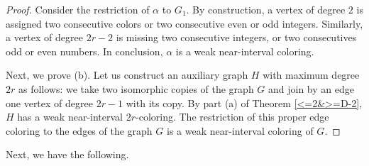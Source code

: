 \documentclass[12pt]{article}
\theoremstyle{plain}
\theoremstyle{definition}
\numberwithin{equation}{section}
\begin{document}
\begin{proof}
Consider the restriction of $\alpha$ to $G_1$. By construction, a vertex of degree $2$ is assigned two consecutive colors or two consecutive even or odd integers.
Similarly, a vertex of degree $2r-2$ is missing two consecutive integers, or two consecutives odd or even numbers. In conclusion, $\alpha$ is
a weak near-interval coloring.


Next, we prove (b).
Let us construct an auxiliary graph $H$ with maximum degree $2r$ as follows: we take two
isomorphic copies of the graph $G$ and join by an edge one vertex of
degree $2r-1$ with its copy. %
By part (a) of Theorem \ref{<=2&>=D-2}, $H$ has a weak near-interval $2r$-coloring. 
The
restriction of this proper edge coloring to the edges of the
graph $G$ is a weak near-interval coloring of $G$.
\end{proof}



Next, we have the following.
\end{document}
